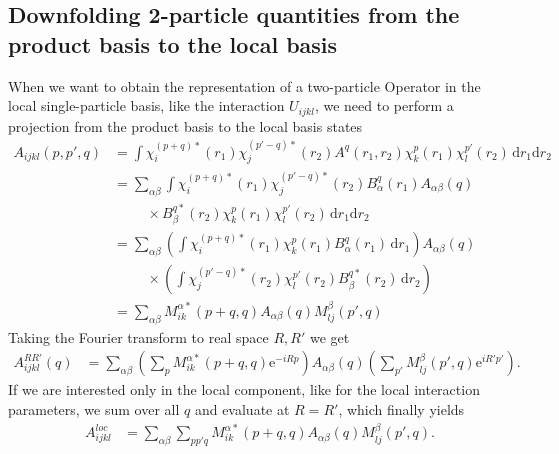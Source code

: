 \documentclass[12pt,a4paper]{scrartcl}
\numberwithin{equation}{section}
\begin{document}
\subsection{Downfolding 2-particle quantities from the product basis to the local basis}
When we want to obtain the representation of a two-particle Operator
in the local single-particle basis, like the interaction $U_{ijkl}$,
we need to perform a projection from the product basis to
the local basis states
\begin{align}
 A_{ijkl}(p,p',q)
 &= \int \chi^{(p+q)*}_i(r_1) \chi^{(p'-q)*}_j(r_2) A^{q}(r_1,r_2)
         \chi^{p}_k(r_1) \chi^{p'}_l(r_2) \, \mathrm{d}r_1 \mathrm{d}r_2 \\
%
&= \sum_{\alpha\beta}\int \chi^{(p+q)*}_i(r_1) \chi^{(p'-q)*}_j(r_2) 
         B^q_{\alpha}(r_1) A_{\alpha\beta}(q) \nonumber \\
& \hspace{1cm} \times B^{q*}_{\beta}(r_2)\chi^{p}_k(r_1) \chi^{p'}_l(r_2) \, \mathrm{d}r_1 \mathrm{d}r_2 \\
%
&= \sum_{\alpha\beta} \left( \int \chi^{(p+q)*}_i(r_1)  \chi^{p}_k(r_1) B^q_{\alpha}(r_1) \,\mathrm{d}r_1 \right)
         A_{\alpha\beta}(q) \nonumber \\
& \hspace{1cm} \times \left( \int \chi^{(p'-q)*}_j(r_2) \chi^{p'}_l(r_2) B^{q*}_{\beta}(r_2)  \, \mathrm{d}r_2 \right) \\
%
&= \sum_{\alpha\beta} M^{\alpha*}_{ik}(p+q,q) A_{\alpha\beta}(q) M^{\beta}_{lj}(p',q)
\end{align}
Taking the Fourier transform to real space $R,R'$ we get
\begin{align}
 A^{RR'}_{ijkl}(q)
%
&= \sum_{\alpha\beta} \left(\sum_p M^{\alpha*}_{ik}(p+q,q) \mathrm{e}^{-iRp}\right)
                     A_{\alpha\beta}(q) 
                     \left( \sum_{p'} M^{\beta}_{lj}(p',q) \mathrm{e}^{iR'p'}\right) .
\end{align}
If we are interested only in the local component, like for the local interaction parameters,
we sum over all $q$ and evaluate at $R=R'$, which finally yields
\begin{align}
 A^{loc}_{ijkl}
%
&= \sum_{\alpha\beta} \sum_{pp'q} M^{\alpha*}_{ik}(p+q,q)
                     A_{\alpha\beta}(q) 
                      M^{\beta}_{lj}(p',q) .
\end{align}


\end{document}
